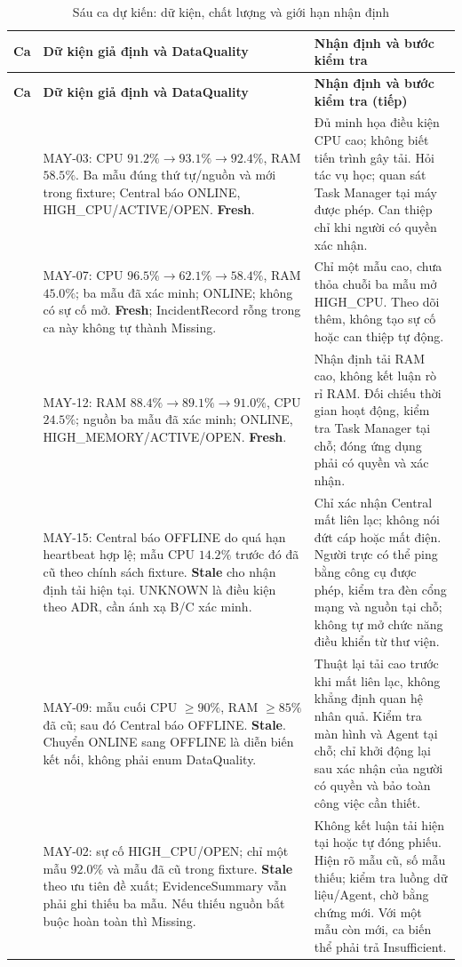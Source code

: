 \documentclass[12pt,a4paper]{article}
\begin{document}
\begingroup
\fontsize{10.5}{13}\selectfont
\setlength{\tabcolsep}{4pt}
\begin{longtable}{@{}p{}p{}p{}@{}}
\caption{Sáu ca dự kiến: dữ kiện, chất lượng và giới hạn nhận định}\label{tab:sau-kich-ban-kiem-thu}\\
\toprule\textbf{Ca} & \textbf{Dữ kiện giả định và DataQuality} & \textbf{Nhận định và bước kiểm tra}\\\midrule
\endfirsthead
\toprule\textbf{Ca} & \textbf{Dữ kiện giả định và DataQuality} & \textbf{Nhận định và bước kiểm tra (tiếp)}\\\midrule
\endhead
\bottomrule\endfoot
1 & MAY-03: CPU $91.2\%\to93.1\%\to92.4\%$, RAM $58.5\%$. Ba mẫu đúng thứ tự/nguồn và mới trong fixture; Central báo ONLINE, HIGH\_CPU/ACTIVE/OPEN. \textbf{Fresh}. & Đủ minh họa điều kiện CPU cao; không biết tiến trình gây tải. Hỏi tác vụ học; quan sát Task Manager tại máy được phép. Can thiệp chỉ khi người có quyền xác nhận.\\\addlinespace[8pt]
2 & MAY-07: CPU $96.5\%\to62.1\%\to58.4\%$, RAM $45.0\%$; ba mẫu đã xác minh; ONLINE; không có sự cố mở. \textbf{Fresh}; IncidentRecord rỗng trong ca này không tự thành Missing. & Chỉ một mẫu cao, chưa thỏa chuỗi ba mẫu mở HIGH\_CPU. Theo dõi thêm, không tạo sự cố hoặc can thiệp tự động.\\\addlinespace[8pt]
3 & MAY-12: RAM $88.4\%\to89.1\%\to91.0\%$, CPU $24.5\%$; nguồn ba mẫu đã xác minh; ONLINE, HIGH\_MEMORY/ACTIVE/OPEN. \textbf{Fresh}. & Nhận định tải RAM cao, không kết luận rò rỉ RAM. Đối chiếu thời gian hoạt động, kiểm tra Task Manager tại chỗ; đóng ứng dụng phải có quyền và xác nhận.\\\addlinespace[8pt]
4 & MAY-15: Central báo OFFLINE do quá hạn heartbeat hợp lệ; mẫu CPU $14.2\%$ trước đó đã cũ theo chính sách fixture. \textbf{Stale} cho nhận định tải hiện tại. UNKNOWN là điều kiện theo ADR, cần ánh xạ B/C xác minh. & Chỉ xác nhận Central mất liên lạc; không nói đứt cáp hoặc mất điện. Người trực có thể ping bằng công cụ được phép, kiểm tra đèn cổng mạng và nguồn tại chỗ; không tự mở chức năng điều khiển từ thư viện.\\\addlinespace[8pt]
5 & MAY-09: mẫu cuối CPU $\ge90\%$, RAM $\ge85\%$ đã cũ; sau đó Central báo OFFLINE. \textbf{Stale}. Chuyển ONLINE sang OFFLINE là diễn biến kết nối, không phải enum DataQuality. & Thuật lại tải cao trước khi mất liên lạc, không khẳng định quan hệ nhân quả. Kiểm tra màn hình và Agent tại chỗ; chỉ khởi động lại sau xác nhận của người có quyền và bảo toàn công việc cần thiết.\\\addlinespace[8pt]
6 & MAY-02: sự cố HIGH\_CPU/OPEN; chỉ một mẫu $92.0\%$ và mẫu đã cũ trong fixture. \textbf{Stale} theo ưu tiên đề xuất; EvidenceSummary vẫn phải ghi thiếu ba mẫu. Nếu thiếu nguồn bắt buộc hoàn toàn thì Missing. & Không kết luận tải hiện tại hoặc tự đóng phiếu. Hiện rõ mẫu cũ, số mẫu thiếu; kiểm tra luồng dữ liệu/Agent, chờ bằng chứng mới. Với một mẫu còn mới, ca biến thể phải trả Insufficient.\\
\end{longtable}
\endgroup
\end{document}
